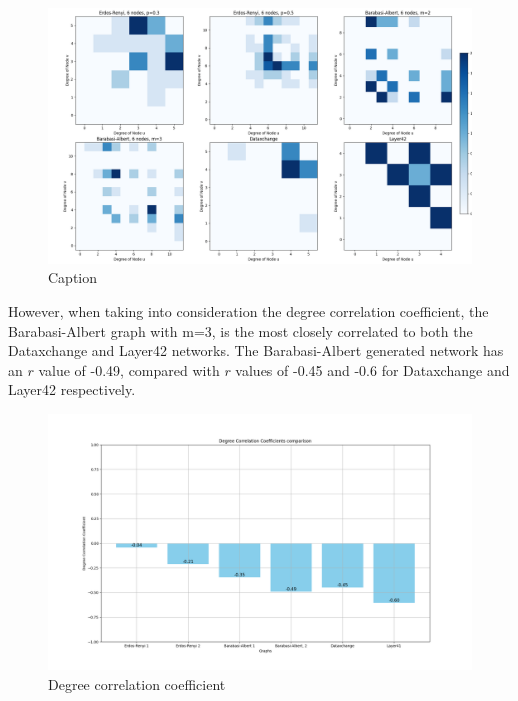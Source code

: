 \begin{figure}
    \centering
    \includegraphics[width=0.9\linewidth]{images/FINAL-TOPO-COMP/Degree-correlation-matrices/6-matrix.png}
    \caption{Caption}
    \label{fig:enter-label}
\end{figure}

However, when taking into consideration the degree correlation coefficient, the Barabasi-Albert graph with m=3, is the most closely correlated to both the Dataxchange and Layer42 networks. The Barabasi-Albert generated network has an $r$ value of -0.49, compared with $r$ values of -0.45 and -0.6 for Dataxchange and Layer42 respectively.  

\begin{figure}
    \centering
    \includegraphics[width=0.9\linewidth]{images/FINAL-TOPO-COMP/Degree-correlation-coeff/deg-coeff-6.png}
    \caption{Degree correlation coefficient}
    \label{fig:enter-label}
\end{figure}

